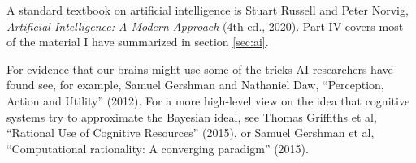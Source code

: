 
\begin{sources}

  A standard textbook on artificial intelligence is Stuart Russell and Peter
  Norvig, \emph{Artificial Intelligence: A Modern Approach} (4th ed., 2020).
  Part IV covers most of the material I have summarized in section \ref{sec:ai}.


  
  For evidence that our brains might use some of the tricks AI researchers have
  found see, for example, Samuel Gershman and Nathaniel Daw, ``Perception,
  Action and Utility'' (2012). For a more high-level view on the idea that
  cognitive systems try to approximate the Bayesian ideal, see Thomas Griffiths
  et al, ``Rational Use of Cognitive Resources'' (2015), or Samuel Gershman et
  al, ``Computational rationality: A converging paradigm'' (2015).





\end{sources}
